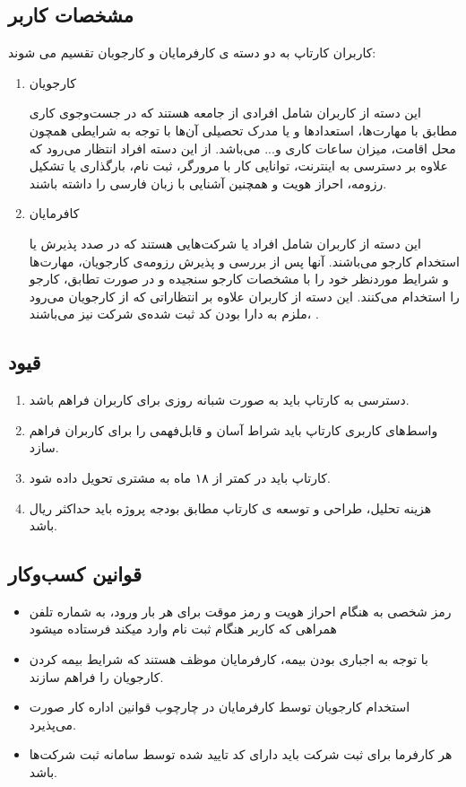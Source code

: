 \documentclass{report}
\begin{document}
			\subsection{مشخصات کاربر}
				کاربران کارتاپ به دو دسته ی کارفرمایان و کارجوبان تقسیم می شوند:
				\begin{enumerate}
					\item 
					کارجویان
					
					این دسته از کاربران شامل افرادی از جامعه هستند که در جست‌وجوی کاری مطابق با مهارت‌ها، استعدادها و یا مدرک تحصیلی آن‌ها با توجه به شرایطی همچون محل اقامت، میزان ساعات کاری و... می‌باشد. از این دسته افراد انتظار می‌رود که علاوه بر دسترسی به اینترنت، توانایی کار با مرورگر، ثبت نام، بارگذاری یا تشکیل رزومه، احراز هویت و همچنین آشنایی با زبان فارسی را داشته باشند.
					\item
					 کافرمایان
					
					این دسته از کاربران شامل افراد یا شرکت‌هایی هستند که در صدد پذیرش یا استخدام کارجو می‌باشند. آنها پس از بررسی و پذیرش رزومه‌ی کارجویان، مهارت‌ها و شرایط موردنظر خود را با مشخصات کارجو سنجیده و در صورت تطابق، کارجو را استخدام می‌کنند. این دسته از کاربران علاوه بر انتظاراتی که از کارجویان می‌رود ،ملزم به دارا بودن کد ثبت شده‌ی شرکت نیز می‌باشند . 
				\end{enumerate}
				
			\subsection{قیود}
				\begin{enumerate}
					\item 
					دسترسی به کارتاپ باید به صورت شبانه روزی برای کاربران فراهم باشد.
					\item 
					واسط‌های کاربری کارتاپ باید شراط آسان و قابل‌فهمی را برای کاربران فراهم سازد.
					\item 
					کارتاپ باید در کمتر از ۱۸ ماه به مشتری تحویل داده شود.
					\item 
					 هزینه تحلیل، طراحی و توسعه ی کارتاپ مطابق بودجه پروژه باید حداکثر  ریال باشد.
				\end{enumerate}
			\subsection{قوانین کسب‌و‌کار}
				\begin{itemize}
					\item 
					رمز شخصی به هنگام احراز هویت و رمز موقت برای هر بار ورود، به شماره تلفن همراهی که کاربر هنگام ثبت نام وارد میکند فرستاده میشود
					\item 
					با توجه به اجباری بودن بیمه، کارفرمایان موظف هستند که شرایط بیمه کردن کارجویان را فراهم سازند.
					\item 
					استخدام کارجویان توسط کارفرمایان در چارچوب قوانین اداره کار صورت می‌پذیرد.
					\item
					هر کارفرما برای ثبت شرکت باید دارای کد تایید شده توسط سامانه ثبت شرکت‌ها باشد.
				\end{itemize}
\end{document}
